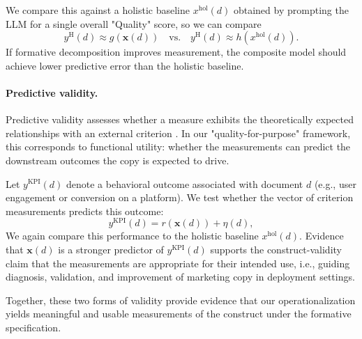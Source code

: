 We compare this against a holistic baseline $x^{\text{hol}}(d)$ obtained by prompting the LLM for a single overall "Quality" score, so we can compare 
\begin{equation}\label{eq:convergent_validity_holistic}
    y^{\text{H}}(d) \approx g(\mathbf{x}(d)) \quad \text{vs.} \quad y^{\text{H}}(d) \approx h(x^{\text{hol}}(d)).
\end{equation}
If formative decomposition improves measurement, the composite model should achieve lower predictive error than the holistic baseline.


\paragraph{Predictive validity.}
Predictive validity assesses whether a measure exhibits the theoretically expected relationships with an external criterion \citep{messick_validity_1994}. In our "quality-for-purpose" framework, this corresponds to functional utility: whether the measurements can predict the downstream outcomes the copy is expected to drive. %

Let $y^{\text{KPI}}(d)$ denote a behavioral outcome associated with document $d$ (e.g., user engagement or conversion on a platform). We test whether the vector of criterion measurements predicts this outcome:
\begin{equation}
    y^{\text{KPI}}(d) = r(\mathbf{x}(d)) + \eta(d),
\end{equation}
We again compare this performance to the holistic baseline $x^{\text{hol}}(d)$. Evidence that $\mathbf{x}(d)$ is a stronger predictor of $y^{\text{KPI}}(d)$ supports the construct-validity claim that the measurements are appropriate for their intended use, i.e., guiding diagnosis, validation, and improvement of marketing copy in deployment settings.

Together, these two forms of validity provide evidence that our operationalization yields meaningful and usable measurements of the construct under the formative specification. 

